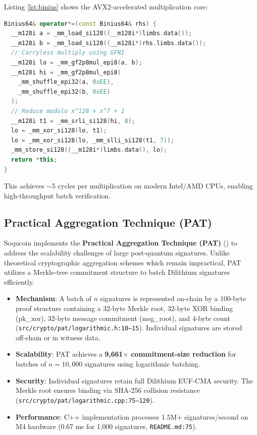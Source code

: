 \documentclass[10pt]{article}
\begin{document}
Listing \ref{lst:binius} shows the AVX2-accelerated multiplication core:

\begin{lstlisting}[language=C++, caption=Binius64 GFNI Multiplication, label={lst:binius}]
Binius64& operator*=(const Binius64& rhs) {
  __m128i a = _mm_load_si128((__m128i*)limbs.data());
  __m128i b = _mm_load_si128((__m128i*)rhs.limbs.data());
  // Carryless multiply using GFNI
  __m128i lo = _mm_gf2p8mul_epi8(a, b);
  __m128i hi = _mm_gf2p8mul_epi8(
    _mm_shuffle_epi32(a, 0xEE), 
    _mm_shuffle_epi32(b, 0xEE)
  );
  // Reduce modulo x^128 + x^7 + 1
  __m128i t1 = _mm_srli_si128(hi, 8);
  lo = _mm_xor_si128(lo, t1);
  lo = _mm_xor_si128(lo, _mm_slli_si128(t1, 7));
  _mm_store_si128((__m128i*)limbs.data(), lo);
  return *this;
}
\end{lstlisting}

This achieves $\sim$5 cycles per multiplication on modern Intel/AMD CPUs, enabling high-throughput batch verification.

\subsection{Practical Aggregation Technique (PAT)}
Soqucoin implements the \textbf{Practical Aggregation Technique (PAT)} (\cite{pat2025}) to address the scalability challenges of large post-quantum signatures. Unlike theoretical cryptographic aggregation schemes which remain impractical, PAT utilizes a Merkle-tree commitment structure to batch Dilithium signatures efficiently.

\begin{itemize}
    \item \textbf{Mechanism}: A batch of $n$ signatures is represented on-chain by a 100-byte proof structure containing a 32-byte Merkle root, 32-byte XOR binding (pk\_xor), 32-byte message commitment (msg\_root), and 4-byte count (\texttt{src/crypto/pat/logarithmic.h:10--15}). Individual signatures are stored off-chain or in witness data.
    \item \textbf{Scalability}: PAT achieves a \textbf{9,661$\times$ commitment-size reduction} for batches of $n=10,000$ signatures using logarithmic batching.
    \item \textbf{Security}: Individual signatures retain full Dilithium EUF-CMA security. The Merkle root ensures binding via SHA-256 collision resistance (\texttt{src/crypto/pat/logarithmic.cpp:75--120}).
    \item \textbf{Performance}: C++ implementation processes 1.5M+ signatures/second on M4 hardware (0.67 ms for 1,000 signatures, \texttt{README.md:75}).
\end{itemize}
\end{document}
